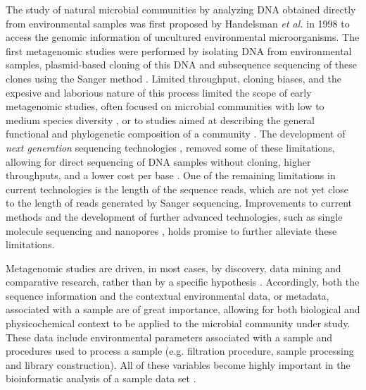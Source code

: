     The study of natural microbial communities by analyzing DNA obtained directly from environmental samples was first proposed by Handelsman \textit{et al.} in 1998 \cite{Handelsman:1998tx} to access the genomic information of uncultured environmental microorganisms. The first metagenomic studies were performed by isolating DNA from environmental samples, plasmid-based cloning of this DNA and subsequence sequencing of these clones using the Sanger method \cite{Tyson:2004bw,Venter:2004hg}. Limited throughput, cloning biases, and the expesive and laborious nature of this process limited the scope of early metagenomic studies, often focused on microbial communities with low to medium species diversity \cite{Tyson:2004bw,Podell:2013kx}, or to studies aimed at describing the general functional and phylogenetic composition of a community  \cite{Venter:2004hg,Rusch:2007ez}. The development of \textit{next generation} sequencing technologies \cite{Mardis:2013gn}, removed some of these limitations, allowing for direct sequencing of DNA samples without cloning,  higher throughputs, and a lower cost per base \cite{Mardis:2013gn}. One of the remaining limitations in current technologies is the length of the sequence reads, which are not yet close to the length of reads generated by Sanger sequencing. Improvements to current methods and the development of further advanced technologies, such as single molecule sequencing \cite{Eid:2009kv} and nanopores \cite{Branton:2008fr}, holds promise to further alleviate these limitations.

Metagenomic studies are driven, in most cases, by discovery, data mining and comparative research, rather than by a specific hypothesis \cite{Wooley:2010uv}. Accordingly, both the sequence information and the contextual environmental data, or metadata, associated with a sample are of great importance, allowing for both biological and physicochemical context to be applied to the microbial community under study. These data include environmental parameters associated with a sample and procedures used to process a sample (e.g. filtration procedure, sample processing and library construction). All of these variables become highly important in the bioinformatic analysis of a sample data set \cite{Narasingarao:2012kp}.

